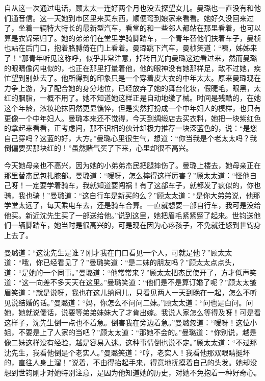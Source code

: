 \par 自从这一次通过电话，顾太太一连好两个月也没去探望女儿。曼璐也一直没有和他们通音信。这一天她到市区里来买东西，顺便弯到娘家来看看。她好久没回来过了，坐着一辆特大特长的最新型汽车，看堂的和一些邻人都站在那里看着，也可以算是衣锦荣归了。她的弟弟们在堂里学骑脚踏车，一个青年替他们扶着车子，曼桢也站在后门口，抱着胳膊倚在门上看着。曼璐跳下汽车，曼桢笑道：“咦，姊姊来了！”那青年听见这称呼，似乎非常注意，掉转目光向曼璐这边看过来，然而曼璐的眼睛像闪电似的，也正在那里打量着他，他的眼神没有她那样足，敌不过她，疾忙望到别处去了。他所得到的印象只是一个穿着皮大衣的中年太太。原来曼璐现在力争上游，为了配合她的身分地位，已经放弃了她的舞台化妆，假睫毛，眼黑，太红的胭脂，一概不用了。她不知道她这样正是自动地缴了械。时间是残酷的，在她这个年龄，浓妆艳抹固然更显憔悴，但是突然打扮成一个中年妇人的模样，也只有更像一个中年妇人。曼璐本来还不觉得，今天到绸缎店去买衣料，她把一块紫红色的拿起来看看，正考虑间，那不识相的伙计却极力推荐一块深蓝色的，说：“是您自己穿吗？这蓝的好，大方。”曼璐心里很生气，想道：“你当我是个老太太吗？我倒偏要买那块红的！”虽然赌气买了下来，心里却很不高兴。
\par 今天她母亲也不高兴，因为她的小弟弟杰民把腿摔伤了。曼璐上楼去，她母亲正在那里替杰民包扎膝部。曼璐道：“嗳呀，怎么摔得这样厉害？”顾太太道：“怪他自己呀！一定要学着骑车，我就知道要闯祸！有了这部车子，就都发了疯似的，你也骑，我也骑！”曼璐道：“这自行车是新买的么？”顾太太道：“是你大弟弟说，他那学堂太远了，每天乘电车去，还是骑车合算。一直就想要一部自行车，我可是没给他买。新近沈先生买了一部送给他。”说到这里，她把眉毛紧紧蹙了起来。世钧送他们一辆脚踏车，她当时是很高兴的，可是现在因为心疼孩子，不免就迁怒到世钧身上去了。
\par 曼璐道：“这沈先生是谁？刚才我在门口看见一个人，可就是他？”顾太太道：“哦，你已经看见了？”曼璐笑道：“是二妹的朋友吗？”顾太太点点头，道：“是她的一个同事。”曼璐道：“他常常来？”顾太太把杰民使开了，方才低声笑道：“这一向差不多天天在这里。”曼璐笑道：“他们是不是算订婚了呢？”顾太太皱眉笑道：“就是说呀，我也在这儿纳闷儿，只看见两人一天到晚在一起，怎么不听见说结婚的话。”曼璐道：“妈，你怎么不问问二妹。”顾太太道：“问也是白问。问她，她就说傻话，说要等弟弟妹妹大了才肯出嫁。我说人家怎么等得及呀！可是看这样子，沈先生倒一点也不着急。倒害我在旁边着急。”曼璐忽道：“嗳呀！这位小姐，不要是上了人家的当吧？”顾太太道：“那她不会的。”曼璐道：“你别说，越是像二妹这样没有经验，越是容易入迷。这种事情倒也说不定。”顾太太道：“不过那沈先生，我看他倒是个老实人。”曼璐笑道：“哼，老实人！我看他那双眼睛挺坏的，直往人身上溜！”说着，不由得抬起手来，得意地抚摸着自己的头发。她却没想到世钧刚才对她特别注意，是因为他知道她的历史，对她不免抱着一种好奇心。
